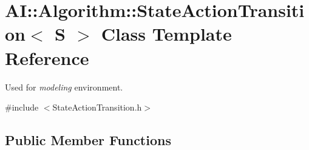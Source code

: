 \hypertarget{classAI_1_1Algorithm_1_1StateActionTransition}{\section{A\-I\-:\-:Algorithm\-:\-:State\-Action\-Transition$<$ S $>$ Class Template Reference}
\label{classAI_1_1Algorithm_1_1StateActionTransition}
}


Used for {\itshape modeling} environment.  




{\ttfamily \#include $<$State\-Action\-Transition.\-h$>$}

\subsection*{Public Member Functions}
